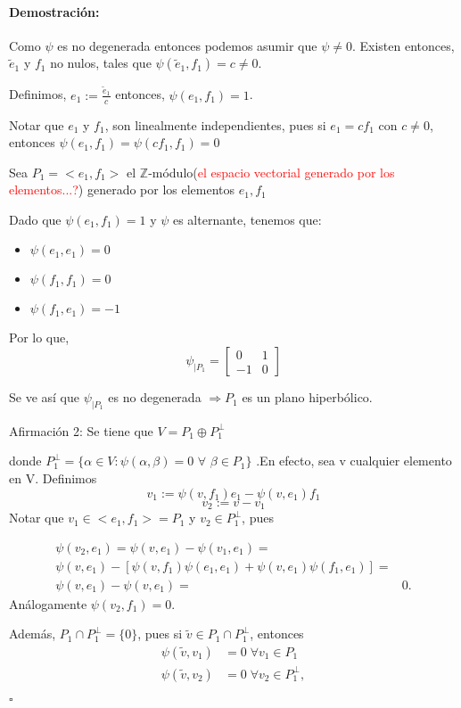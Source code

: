 \documentclass[12pt]{article}
\newenvironment{proof}{\paragraph{Demostración:}}{\hfill$\square$}
\begin{document}
\begin{proof}
Como $\psi$ es no degenerada entonces podemos asumir que $\psi \neq 0$.
Existen entonces, $\tilde{e}_1$ y $f_1$ no nulos, tales que $\psi(\tilde{e}_1,f_1)=c\neq0$.

Definimos, $e_1:=\frac{\tilde{e}_1}{c}$ entonces, $\psi(e_1,f_1)=1$.

Notar que $e_1$ y $f_1$, son linealmente independientes, pues si $e_1=c f_1$ con $c\neq 0$,
entonces $\psi(e_1,f_1)=\psi(c f_1,f_1)=0$


Sea $P_1=<e_1,f_1>$ el $\mathbb{Z}$-módulo(\textcolor{red}{el espacio vectorial generado por los elementos...?}) generado por los elementos $e_1,f_1$
    
Dado que $\psi(e_1,f_1)=1$ y $\psi$ es alternante, tenemos que:
\begin{itemize}
 \item $\psi(e_1,e_1)=0$
 \item $\psi(f_1,f_1)=0$
 \item $\psi(f_1,e_1)=-1$
\end{itemize}

Por lo que, 
$$\psi_{|P_1} = 
\begin{bmatrix}
 0 & 1\\ 
 -1& 0
\end{bmatrix}
$$

Se ve así que $\psi_{|P_1}$ es no degenerada $\Rightarrow P_1$ es un plano hiperbólico.
\newline

Afirmación 2: Se tiene que  $V = P_1 \oplus P_1^{\bot}$

 donde $P_1^{\bot}= \{ \alpha \in V: \psi(\alpha,\beta)=0$  $\forall$  $\beta \in P_1 \} $ .En efecto,  
 sea v cualquier elemento en V.
 Definimos 
 $$v_1:=\psi(v,f_1)e_1-\psi(v,e_1)f_1$$
 $$v_2:=v-v_1$$
 Notar que $v_1 \in <e_1,f_1>=P_1$ y $v_2 \in P_1^{\bot}$, pues 
 
 $$\begin{aligned}
 \psi(v_2,e_1)=\psi(v,e_1)-\psi(v_1,e_1)=&\\
 \psi (v,e_1)-[\psi(v,f_1) \psi(e_1,e_1) + \psi(v,e_1) \psi(f_1,e_1)]=&\\
 \psi(v,e_1)- \psi(v,e_1)=&0.
 \end{aligned}$$
 Análogamente $\psi(v_2,f_1)=0$.
 
 
 Además, $P_1  \cap P_1^{\bot} = \{0\}$, pues si  $\tilde{v} \in  P_1 \cap P_1^{\bot}$, entonces
 $$\begin{aligned}
 \psi(\tilde{v},v_1)&=0 \;\forall v_1 \in P_1\\ 
 \psi(\tilde{v},v_2)&=0 \;\forall v_2 \in P_1^{\bot},
 \end{aligned}$$
 

\end{proof}
\end{document}
